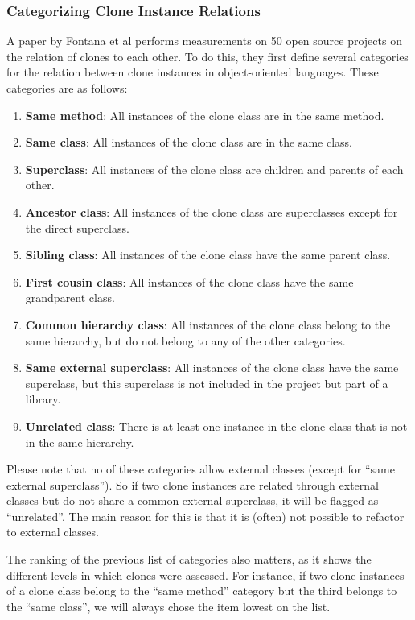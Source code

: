 \documentclass[a4paper]{article}
\begin{document}
\subsubsection{Categorizing Clone Instance Relations}
A paper by Fontana et al \cite{fontana2015duplicated} performs measurements on 50 open source projects on the relation of clones to each other. To do this, they first define several categories for the relation between clone instances in object-oriented languages. These categories are as follows:
\begin{enumerate}
  \item \textbf{Same method}: All instances of the clone class are in the same method.
  \item \textbf{Same class}: All instances of the clone class are in the same class.
  \item \textbf{Superclass}: All instances of the clone class are children and parents of each other.
  \item \textbf{Ancestor class}: All instances of the clone class are superclasses except for the direct superclass.
  \item \textbf{Sibling class}: All instances of the clone class have the same parent class.
  \item \textbf{First cousin class}: All instances of the clone class have the same grandparent class.
\item \textbf{Common hierarchy class}: All instances of the clone class belong to the same hierarchy, but do not belong to any of the other categories.
\item \textbf{Same external superclass}: All instances of the clone class have the same superclass, but this superclass is not included in the project but part of a library.
\item \textbf{Unrelated class}: There is at least one instance in the clone class that is not in the same hierarchy.
\end{enumerate}
Please note that no of these categories allow external classes (except for ``same external superclass''). So if two clone instances are related through external classes but do not share a common external superclass, it will be flagged as ``unrelated''. The main reason for this is that it is (often) not possible to refactor to external classes.

The ranking of the previous list of categories also matters, as it shows the different levels in which clones were assessed. For instance, if two clone instances of a clone class belong to the ``same method'' category but the third belongs to the ``same class'', we will always chose the item lowest on the list.
\end{document}
